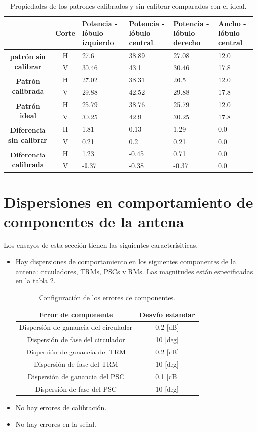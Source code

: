 \begin{table}[H]
  \footnotesize
  \centering
  \begin{tabular}{|c|c|p{2cm}|p{2cm}|p{2cm}|p{2cm}|}
    \cline{2-6}
    \multicolumn{1}{c|}{} & \textbf{Corte} & \textbf{Potencia - lóbulo izquierdo} & \textbf{Potencia - lóbulo central} &
    \textbf{Potencia - lóbulo derecho} & \textbf{Ancho - lóbulo central} \tabularnewline\hline
    \multirow{2}{*}{\textbf{patrón sin calibrar}} & H & 27.6 & 38.89 & 27.08 & 12.0 \tabularnewline\cline{2-6}
     & V & 30.46 & 43.1 & 30.46 & 17.8 \tabularnewline\hline
    \multirow{2}{*}{\textbf{Patrón calibrada}} & H & 27.02 & 38.31 & 26.5 & 12.0 \tabularnewline\cline{2-6}
     & V & 29.88 & 42.52 & 29.88 & 17.8 \tabularnewline\hline
    \multirow{2}{*}{\textbf{Patrón ideal}} & H & 25.79 & 38.76 & 25.79 & 12.0 \tabularnewline\cline{2-6}
     & V & 30.25 & 42.9 & 30.25 & 17.8 \tabularnewline\hline
    \multirow{2}{*}{\textbf{Diferencia sin calibrar}} & H & 1.81 & 0.13 & 1.29 & 0.0\tabularnewline\cline{2-6}
     & V & 0.21 & 0.2 & 0.21 & 0.0 \tabularnewline\hline
    \multirow{2}{*}{\textbf{Diferencia calibrada}} & H & 1.23 & -0.45 & 0.71 & 0.0 \tabularnewline\cline{2-6}
     & V & -0.37 & -0.38 & -0.37 & 0.0 \tabularnewline\hline
  \end{tabular}
  \caption{Propiedades de los patrones calibrados y sin calibrar comparados con el ideal.}
  \label{tab:deadTRMsMutual10degRow}
\end{table}


\section{Dispersiones en comportamiento de componentes de la antena}

Los ensayos de esta sección tienen las siguientes caracterísiticas,
\begin{itemize}
	\item Hay dispersiones de comportamiento en los siguientes componentes de la antena: circuladores, TRMs, PSCs y RMs. Las 
		magnitudes están especificadas en la tabla \ref{tab:errorReferences}.
		\begin{table}[H]
		  \footnotesize
		  \centering
		  \begin{tabular}{|c|c|}
			\hline
			\textbf{Error de componente} & \textbf{Desvío estandar} \tabularnewline \hline 
			Dispersión de ganancia del circulador &  0.2 [dB] \tabularnewline\hline 
			Dispersión de fase del circulador &  10 [deg] \tabularnewline\hline 
			Dispersión de ganancia del TRM &  0.2 [dB] \tabularnewline\hline 
			Dispersión de fase del TRM &  10 [deg] \tabularnewline\hline 
			Dispersión de ganancia del PSC &  0.1 [dB] \tabularnewline\hline 
			Dispersión de fase del PSC &  10 [deg] \tabularnewline\hline 
		  \end{tabular}
		  \caption{Configuración de los errores de componentes.}
		  \label{tab:errorReferences}
		\end{table}
	\item No hay errores de calibración.
	\item No hay errores en la señal.
\end{itemize}

